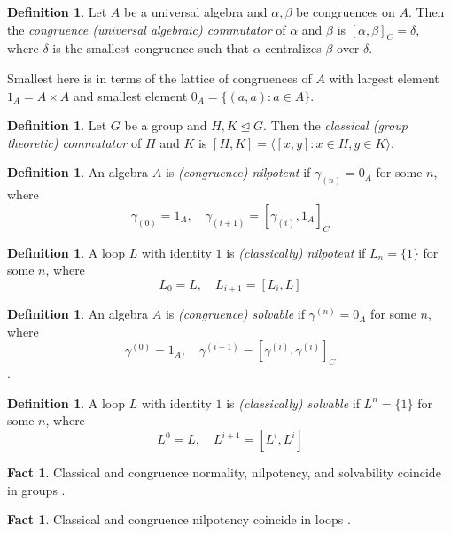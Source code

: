 \documentclass[12pt, twoside, openright]{report}
\theoremstyle{definition}
\newtheorem{fct}[thm]{Fact}
\newtheorem{dfn}[thm]{Definition}
\begin{document}
\begin{dfn}
  Let $A$ be a universal algebra and $\alpha, \beta$ be congruences on $A$. Then the
    \emph{congruence (universal algebraic) commutator} of $\alpha$ and $\beta$ is
    $[\alpha, \beta]_C = \delta$, where $\delta$ is the smallest congruence such that
    $\alpha$ centralizes $\beta$ over $\delta$. 

  Smallest here is in terms of the lattice of congruences of $A$ with largest element
    $1_A = A\times A$ and smallest element $0_A = \{(a, a) : a\in A\}$.
\end{dfn}

\begin{dfn}
  Let $G$ be a group and $H, K\unlhd G$. Then the \emph{classical (group theoretic) commutator}
    of $H$ and $K$ is $[H, K] = \langle [x, y] : x\in H, y\in K\rangle$.
\end{dfn}

\begin{dfn}
  An algebra $A$ is \emph{(congruence) nilpotent} if $\gamma_{(n)} = 0_A$ for some $n$, where
  \[\gamma_{(0)} = 1_A,\quad \gamma_{(i + 1)} = [\gamma_{(i)}, 1_A]_C\]
\end{dfn}

\begin{dfn}
  A loop $L$ with identity $1$ is \emph{(classically) nilpotent} if $L_n = \{1\}$ for some $n$, where
  \[L_0 = L,\quad L_{i + 1} = [L_i, L]\]
\end{dfn}

\begin{dfn}
  An algebra $A$ is \emph{(congruence) solvable} if $\gamma^{(n)} = 0_A$ for some $n$, where
  \[\gamma^{(0)} = 1_A,\quad \gamma^{(i + 1)} = [\gamma^{(i)}, \gamma^{(i)}]_C\].
\end{dfn}

\begin{dfn}
  A loop $L$ with identity $1$ is \emph{(classically) solvable} if $L^n = \{1\}$ for some $n$, where
  \[L^0 = L,\quad L^{i + 1} = [L^i, L^i]\]
\end{dfn}

\begin{fct}
  Classical and congruence normality, nilpotency, and solvability coincide in groups \cite{ComTheory}.
\end{fct}

\begin{fct}
  Classical and congruence nilpotency coincide in loops \cite{ComTheory}.
\end{fct}
\end{document}
